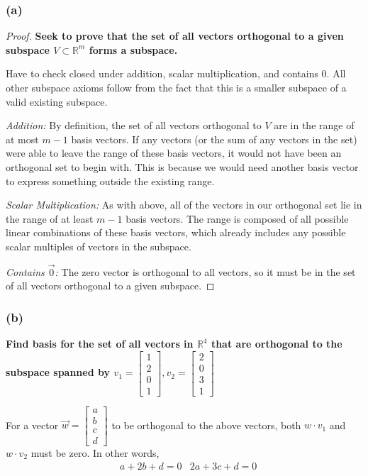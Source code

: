 \documentclass[10pt,letterpaper]{article}
\newcommand{\R}{\mathbb{R}}
\begin{document}
	\subsubsection*{(a)} 
	\begin{proof}
		\textbf{Seek to prove that the set of all vectors orthogonal to a given subspace $V \subset \R^m$ forms a subspace.}
		
		Have to check closed under addition, scalar multiplication, and contains 0. All other subspace axioms follow from the fact that this is a smaller subspace of a valid existing subspace. 
		
		\textit{Addition: } By definition, the set of all vectors orthogonal to $V$ are in the range of at most $m-1$ basis vectors.  If any vectors (or the sum of any vectors in the set) were able to leave the range of these basis vectors, it would not have been an orthogonal set to begin with.  This is because we would need another basis vector to express something outside the existing range. 
		
		\textit{Scalar Multiplication: } As with above, all of the vectors in our orthogonal set lie in the range of at least $m-1$ basis vectors.  The range is composed of all possible linear combinations of these basis vectors, which already includes any possible scalar multiples of vectors in the subspace. 
		
		\textit{Contains $\vec{0}$: } The zero vector is orthogonal to all vectors, so it must be in the set of all vectors orthogonal to a given subspace.  
	\end{proof}
	
	\subsubsection*{(b)} \textbf{Find  basis for the set of all vectors in $\R^4$ that are orthogonal to the subspace spanned by $v_1 = \begin{bmatrix}
		1 \\ 2 \\ 0 \\ 1
		\end{bmatrix}, v_2 = \begin{bmatrix}
		2 \\ 0 \\ 3 \\ 1
		\end{bmatrix}$} 
		
		For a vector $\vec{w} = \begin{bmatrix}
		a \\ b \\ c \\ d 
		\end{bmatrix}$ to be orthogonal to the above vectors, both $w \cdot v_1$ and $w \cdot v_2$ must be zero.  In other words, 
		\begin{align*}
		& a + 2b + d = 0 & 2a + 3c + d = 0
		\end{align*}
		
\end{document}

